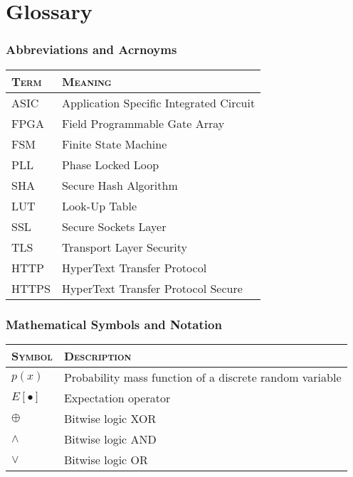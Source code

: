\chapter*{Glossary}

\subsection*{Abbreviations and Acrnoyms}
\begin{table}[h!]
	\begin{center}
		\begin{tabularx}{\textwidth}{ll}
			\toprule
			\textsc{Term} & \textsc{Meaning} \\ 
			\midrule
			ASIC & Application Specific Integrated Circuit\\
			FPGA & Field Programmable Gate Array \\
			FSM & Finite State Machine \\
			PLL & Phase Locked Loop\\
			SHA & Secure Hash Algorithm \\
			LUT & Look-Up Table\\
			SSL & Secure Sockets Layer \\
			TLS & Transport Layer Security \\
			HTTP & HyperText Transfer Protocol \\
			HTTPS & HyperText Transfer Protocol Secure \\

			\bottomrule
		\end{tabularx}
	\end{center}
\end{table}


\subsection*{Mathematical Symbols and Notation}
\begin{table}[h!]
	\begin{center}
		\begin{tabularx}{\textwidth}{ll}
			\toprule
			\textsc{Symbol} & \textsc{Description} \\ 
			\midrule
			$p(x)$ & Probability mass function of a discrete random variable\\
			$E[\bullet]$ & Expectation operator \\
			$\oplus$ & Bitwise logic XOR\\
			$\wedge$ & Bitwise logic AND\\
			$\vee$ & Bitwise logic OR\\
			\bottomrule
		\end{tabularx}
	\end{center}
\end{table}